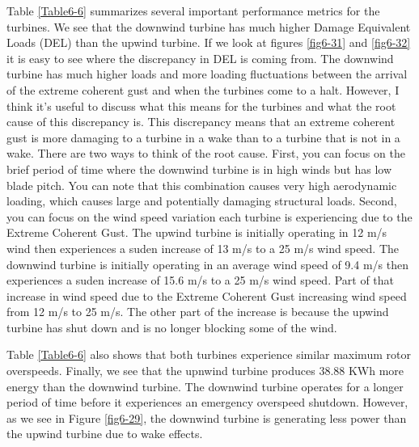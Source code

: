 Table \ref{Table6-6} summarizes several important performance metrics for the turbines. We see that the downwind turbine has much higher Damage Equivalent Loads (DEL) than the upwind turbine. If we look at figures \ref{fig6-31} and \ref{fig6-32} it is easy to see where the discrepancy in DEL is coming from. The downwind turbine has much higher loads and more loading fluctuations between the arrival of the extreme coherent gust and when the turbines come to a halt. However, I think it's useful to discuss what this means for the turbines and what the root cause of this discrepancy is. This discrepancy means that an extreme coherent gust is more damaging to a turbine in a wake than to a turbine that is not in a wake. There are two ways to think of the root cause. First, you can focus on the brief period of time where the downwind turbine is in high winds but has low blade pitch. You can note that this combination causes very high aerodynamic loading, which causes large and potentially damaging structural loads. Second, you can focus on the wind speed variation each turbine is experiencing due to the Extreme Coherent Gust. The upwind turbine is initially operating in 12 m/s wind then experiences a suden increase of 13 m/s to a 25 m/s wind speed. The downwind turbine is initially operating in an average wind speed of 9.4 m/s then experiences a suden increase of 15.6 m/s to a 25 m/s wind speed. Part of that increase in wind speed due to the Extreme Coherent Gust increasing wind speed from 12 m/s to 25 m/s. The other part of the increase is because the upwind turbine has shut down and is no longer blocking some of the wind.  


Table \ref{Table6-6} also shows that both turbines experience similar maximum rotor overspeeds. Finally, we see that the upnwind turbine produces 38.88 KWh more energy than the downwind turbine. The downwind turbine operates for a longer period of time before it experiences an emergency overspeed shutdown. However, as we see in Figure \ref{fig6-29}, the downwind turbine is generating less power than the upwind turbine due to wake effects.

